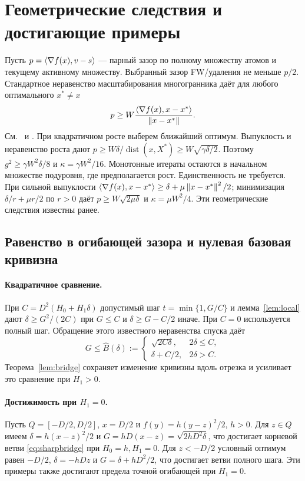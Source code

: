 \section{Геометрические следствия и достигающие примеры}
\label{app:geometry}
Пусть $p=\left\langle\nabla f(x),v-s\right\rangle$ — парный зазор по полному
множеству атомов и текущему активному множеству. Выбранный зазор
FW/удаления не меньше $p/2$. Стандартное неравенство масштабирования
многогранника даёт для любого оптимального $x^*\ne x$
\[
 p\ge W\frac{\left\langle\nabla f(x),x-x^*\right\rangle}{\left\|x-x^*\right\|}.
\]
См.~\cite[теорема 3]{lacostejaggi} и
\cite[леммы 3.4 и 3.6]{restartfw}. При квадратичном росте выберем
ближайший оптимум. Выпуклость и неравенство роста дают
$p\ge W\delta/\operatorname{dist}(x,X^*)
\ge W\sqrt{\gamma\delta/2}$. Поэтому
$g^2\ge\gamma W^2\delta/8$ и $\kappa=\gamma W^2/16$.
Монотонные итераты остаются в начальном множестве подуровня, где
предполагается рост. Единственность не требуется. При сильной
выпуклости
$\left\langle\nabla f(x),x-x^*\right\rangle\ge\delta+\mu\left\|x-x^*\right\|^2/2$;
минимизация $\delta/r+\mu r/2$ по $r>0$ даёт
$p\ge W\sqrt{2\mu\delta}$ и $\kappa=\mu W^2/4$.
Эти геометрические следствия известны ранее.

\subsection{Равенство в огибающей зазора и нулевая базовая кривизна}
\label{app:bridge}
\paragraph{Квадратичное сравнение.}
При $C=D^2(H_0+H_1\delta)$ допустимый шаг
$t=\min\{1,G/C\}$ и лемма~\ref{lem:local} дают
$\delta\ge G^2/(2C)$ при $G\le C$ и
$\delta\ge G-C/2$ иначе. При $C=0$ используется полный шаг.
Обращение этого известного неравенства спуска даёт
\begin{equation}\label{eq:sharpbridge}
 G\le\widehat B(\delta):=
 \begin{cases}\sqrt{2C\delta},&2\delta\le C,\\
 \delta+C/2,&2\delta>C.\end{cases}
\end{equation}
Теорема~\ref{lem:bridge} сохраняет изменение кривизны вдоль отрезка
и усиливает это сравнение при $H_1>0$.

\paragraph{Достижимость при $H_1=0$.}
Пусть $Q=[-D/2,D/2]$, $x=D/2$ и $f(y)=h(y-z)^2/2$, $h>0$.
Для $z\in Q$ имеем $\delta=h(x-z)^2/2$ и
$G=hD(x-z)=\sqrt{2hD^2\delta}$, что достигает корневой ветви
\eqref{eq:sharpbridge} при $H_0=h,H_1=0$.
Для $z<-D/2$ условный оптимум равен $-D/2$,
$\delta=-hDz$ и $G=\delta+hD^2/2$, что достигает ветви полного
шага. Эти примеры также достигают предела точной огибающей при $H_1=0$.

